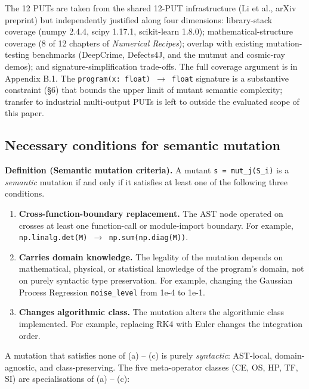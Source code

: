 \documentclass[acmsmall,screen,review]{acmart}
\newcounter{none}
\begin{document}
The 12 PUTs are taken from the shared 12-PUT infrastructure (Li et al., arXiv preprint) but
independently justified along four dimensions: library-stack coverage
(numpy 2.4.4, scipy 1.17.1, scikit-learn 1.8.0); mathematical-structure
coverage (8 of 12 chapters of \emph{Numerical Recipes}); overlap with
existing mutation-testing benchmarks (DeepCrime, Defects4J, and the
mutmut and cosmic-ray demos); and signature-simplification trade-offs.
The full coverage argument is in Appendix B.1. The
\texttt{program(x:\ float)\ $\to$\ float} signature is a substantive
constraint (§6) that bounds the upper limit of mutant semantic
complexity; transfer to industrial multi-output PUTs is left to
outside the evaluated scope of this paper.

\subsection{Necessary conditions for semantic mutation}\label{necessary-conditions-for-semantic-mutation-layer-1}

\textbf{Definition (Semantic mutation criteria).} A mutant
\texttt{s\textquotesingle{}\ =\ mut\_j(S\_i)} is a \emph{semantic}
mutation if and only if it satisfies at least one of the following three
conditions.

\begin{enumerate}
\def\labelenumi{(\alph{enumi})}
\item
  \textbf{Cross-function-boundary replacement.} The AST node operated on
  crosses at least one function-call or module-import boundary. For
  example, \texttt{np.linalg.det(M)\ $\to$\ np.sum(np.diag(M))}.
\item
  \textbf{Carries domain knowledge.} The legality of the mutation
  depends on mathematical, physical, or statistical knowledge of the
  program's domain, not on purely syntactic type preservation. For
  example, changing the Gaussian Process Regression
  \texttt{noise\_level} from 1e-4 to 1e-1.
\item
  \textbf{Changes algorithmic class.} The mutation alters the
  algorithmic class implemented. For example, replacing RK4 with Euler
  changes the integration order.
\end{enumerate}

A mutation that satisfies none of (a) -- (c) is purely \emph{syntactic}:
AST-local, domain-agnostic, and class-preserving. The five meta-operator
classes (CE, OS, HP, TF, SI) are specialisations of (a) -- (c):
\end{document}
